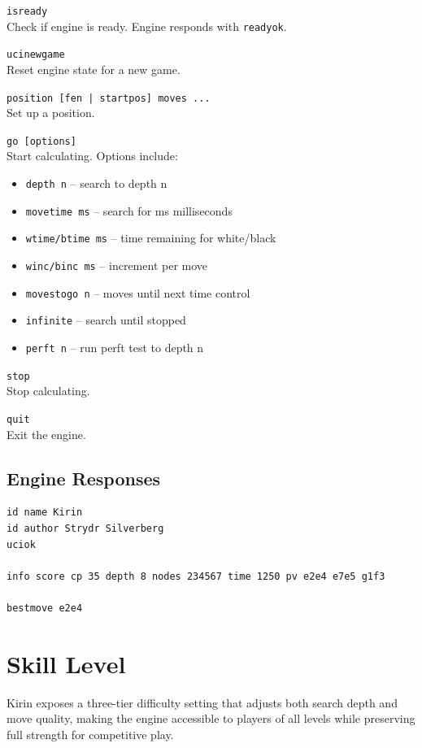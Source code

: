 \documentclass[11pt,a4paper]{report}
\newcommand{\apiendpoint}[3]{%
    \noindent\fbox{\texttt{#1}} \texttt{#2}\\
    #3\vspace{0.5em}
}
\begin{document}
\apiendpoint{IN}{isready}{Check if engine is ready. Engine responds with \texttt{readyok}.}

\apiendpoint{IN}{ucinewgame}{Reset engine state for a new game.}

\apiendpoint{IN}{position [fen | startpos] moves ...}{Set up a position.}

\apiendpoint{IN}{go [options]}{Start calculating. Options include:}
\begin{itemize}[noitemsep]
    \item \texttt{depth n} -- search to depth n
    \item \texttt{movetime ms} -- search for ms milliseconds
    \item \texttt{wtime/btime ms} -- time remaining for white/black
    \item \texttt{winc/binc ms} -- increment per move
    \item \texttt{movestogo n} -- moves until next time control
    \item \texttt{infinite} -- search until stopped
    \item \texttt{perft n} -- run perft test to depth n
\end{itemize}

\apiendpoint{IN}{stop}{Stop calculating.}

\apiendpoint{IN}{quit}{Exit the engine.}

\subsection{Engine Responses}

\begin{lstlisting}
id name Kirin
id author Strydr Silverberg
uciok

info score cp 35 depth 8 nodes 234567 time 1250 pv e2e4 e7e5 g1f3

bestmove e2e4
\end{lstlisting}

\section{Skill Level}

Kirin exposes a three-tier difficulty setting that adjusts both search depth and
move quality, making the engine accessible to players of all levels while
preserving full strength for competitive play.
\end{document}
